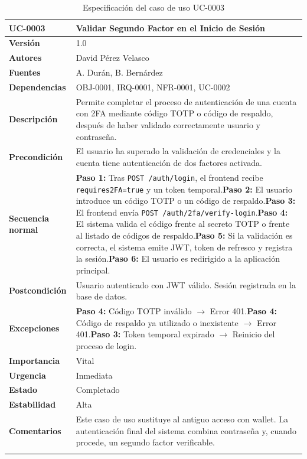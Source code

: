 \documentclass[11pt, a4paper]{article}
\begin{document}
\begin{longtable}{|p{4cm}|p{10cm}|}
\hline
\textbf{UC-0003} & Validar Segundo Factor en el Inicio de Sesión \\
\hline
\textbf{Versión} & 1.0 \\
\hline
\textbf{Autores} & David Pérez Velasco \\
\hline
\textbf{Fuentes} & A. Durán, B. Bernárdez \\
\hline
\textbf{Dependencias} & OBJ-0001, IRQ-0001, NFR-0001, UC-0002 \\
\hline
\textbf{Descripción} & Permite completar el proceso de autenticación de una cuenta con 2FA mediante código TOTP o código de respaldo, después de haber validado correctamente usuario y contraseña. \\
\hline
\textbf{Precondición} & El usuario ha superado la validación de credenciales y la cuenta tiene autenticación de dos factores activada. \\
\hline
\textbf{Secuencia normal} & \textbf{Paso 1:} Tras \texttt{POST /auth/login}, el frontend recibe \texttt{requires2FA=true} y un token temporal.\newline\textbf{Paso 2:} El usuario introduce un código TOTP o un código de respaldo.\newline\textbf{Paso 3:} El frontend envía \texttt{POST /auth/2fa/verify-login}.\newline\textbf{Paso 4:} El sistema valida el código frente al secreto TOTP o frente al listado de códigos de respaldo.\newline\textbf{Paso 5:} Si la validación es correcta, el sistema emite JWT, token de refresco y registra la sesión.\newline\textbf{Paso 6:} El usuario es redirigido a la aplicación principal. \\
\hline
\textbf{Postcondición} & Usuario autenticado con JWT válido. Sesión registrada en la base de datos. \\
\hline
\textbf{Excepciones} & \textbf{Paso 4:} Código TOTP inválido $\rightarrow$ Error 401.\newline\textbf{Paso 4:} Código de respaldo ya utilizado o inexistente $\rightarrow$ Error 401.\newline\textbf{Paso 3:} Token temporal expirado $\rightarrow$ Reinicio del proceso de login. \\
\hline
\textbf{Importancia} & Vital \\
\hline
\textbf{Urgencia} & Inmediata \\
\hline
\textbf{Estado} & Completado \\
\hline
\textbf{Estabilidad} & Alta \\
\hline
\textbf{Comentarios} & Este caso de uso sustituye al antiguo acceso con wallet. La autenticación final del sistema combina contraseña y, cuando procede, un segundo factor verificable. \\
\hline
\caption{Especificación del caso de uso UC-0003}
\end{longtable}
\end{document}

